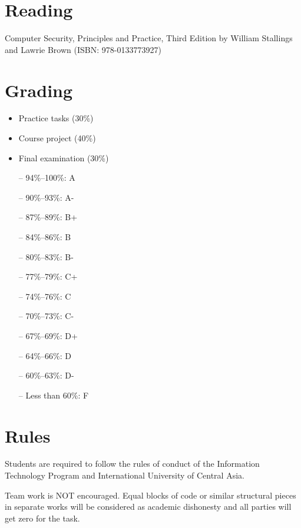 \documentclass[12pt,a4paper,oneside]{article}
\begin{document}
    \section{Reading}

        Computer Security, Principles and Practice, Third Edition by William Stallings and Lawrie Brown (ISBN: 978-0133773927)

    \section{Grading}

        \begin{itemize}
            \item Practice tasks (30\%)
            \item Course project (40\%)
            \item Final examination (30\%)
        \end{itemize}

        \begin{itemize} \itemsep-10pt \parskip0pt 
            \item[--] 94\%--100\%: A\\
            \item[--] 90\%--93\%: A-\\
            \item[--] 87\%--89\%: B+\\
            \item[--] 84\%--86\%: B\\
            \item[--] 80\%--83\%: B-\\
            \item[--] 77\%--79\%: C+\\
            \item[--] 74\%--76\%: C\\
            \item[--] 70\%--73\%: C-\\
            \item[--] 67\%--69\%: D+\\
            \item[--] 64\%--66\%: D\\
            \item[--] 60\%--63\%: D-\\
            \item[--] Less than 60\%: F
        \end{itemize}

    \section{Rules}

        Students are required to follow the rules of conduct of the Information Technology Program and International University of Central Asia.

        Team work is NOT encouraged. Equal blocks of code or similar structural
        pieces in separate works will be considered as academic dishonesty and
        all parties will get zero for the task.
\end{document}
